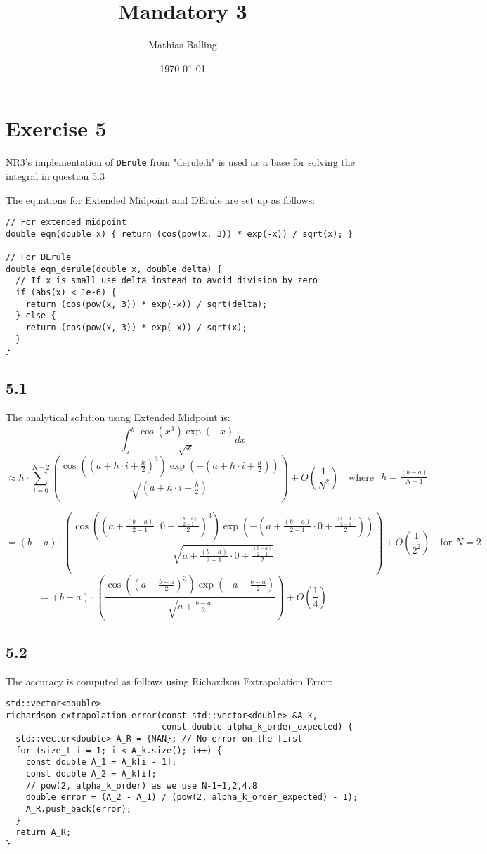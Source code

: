 \documentclass{article}
\title{Mandatory 3}
\author{Mathias Balling}
\date{\today}
\begin{document}
\maketitle

\section*{Exercise 5}
NR3's implementation of \texttt{DErule} from "derule.h" is used as a base for solving the integral in question 5.3

The equations for Extended Midpoint and DErule are set up as follows:
\begin{verbatim}
// For extended midpoint
double eqn(double x) { return (cos(pow(x, 3)) * exp(-x)) / sqrt(x); }

// For DErule
double eqn_derule(double x, double delta) {
  // If x is small use delta instead to avoid division by zero
  if (abs(x) < 1e-6) {
    return (cos(pow(x, 3)) * exp(-x)) / sqrt(delta);
  } else {
    return (cos(pow(x, 3)) * exp(-x)) / sqrt(x);
  }
}
\end{verbatim}

\subsection*{5.1}
The analytical solution using Extended Midpoint is:
$$
\int_{a}^{b}\frac{\cos(x^3)\exp(-x)}{\sqrt{x}}dx
$$
$$
\approx
  h\cdot \sum_{i=0}^{N-2}\left(
  \frac{
  \cos\left(\left(a+h\cdot i+\frac{h}{2}\right)^3\right)\exp\left(-(a+h\cdot i+\frac{h}{2})\right)
}{
  \sqrt{(a+h\cdot i+\frac{h}{2})}
}
\right)+O\left(\frac{1}{N^2}\right)
\quad\text{where } \begin{array}{l}
  h=\frac{(b-a)}{N-1}\\
\end{array}
$$

$$
=(b-a)\cdot\left(
  \frac{
  \cos\left(\left(a+\frac{(b-a)}{2-1}\cdot 0+\frac{\frac{(b-a)}{2-1}}{2}\right)^3\right)\exp\left(-(a+\frac{(b-a)}{2-1}\cdot 0+\frac{\frac{(b-a)}{2-1}}{2})\right)
}{
  \sqrt{a+\frac{(b-a)}{2-1}\cdot 0+\frac{\frac{(b-a)}{2-1}}{2}}
}
\right)+O\left(\frac{1}{2^2}\right)
\quad{\text{for } N=2}
$$
$$
=(b-a)\cdot\left(
  \frac{
  \cos\left(\left(a+\frac{b-a}{2}\right)^3\right)\exp\left(-a-\frac{b-a}{2}\right)
}{
  \sqrt{a+\frac{b-a}{2}}
}
\right)+O\left(\frac{1}{4}\right)
$$

\subsection*{5.2}
The accuracy is computed as follows using Richardson Extrapolation Error:
\begin{verbatim}
std::vector<double> 
richardson_extrapolation_error(const std::vector<double> &A_k,
                               const double alpha_k_order_expected) {
  std::vector<double> A_R = {NAN}; // No error on the first
  for (size_t i = 1; i < A_k.size(); i++) {
    const double A_1 = A_k[i - 1];
    const double A_2 = A_k[i];
    // pow(2, alpha_k_order) as we use N-1=1,2,4,8
    double error = (A_2 - A_1) / (pow(2, alpha_k_order_expected) - 1);
    A_R.push_back(error);
  }
  return A_R;
}
\end{verbatim}
\end{document}
